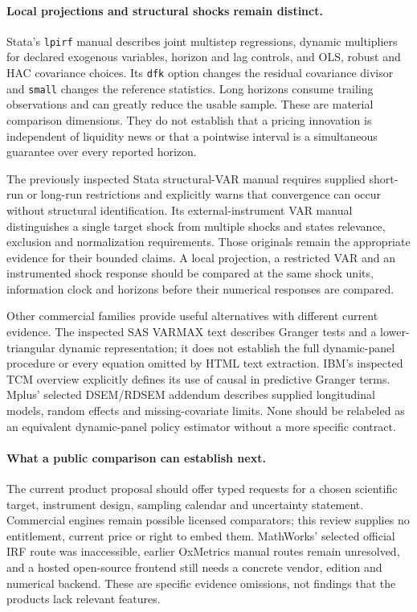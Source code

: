 \paragraph{Local projections and structural shocks remain distinct.}
Stata's \texttt{lpirf} manual describes joint multistep regressions, dynamic
multipliers for declared exogenous variables, horizon and lag controls, and
OLS, robust and HAC covariance choices. Its \texttt{dfk} option changes
the residual covariance divisor and \texttt{small} changes the reference
statistics. Long horizons consume trailing observations and can greatly
reduce the usable sample. These are material comparison dimensions. They
do not establish that a pricing innovation is independent of liquidity news
or that a pointwise interval is a simultaneous guarantee over every reported
horizon.\citep{exec19_dynamic_stata_lp}

The previously inspected Stata structural-VAR manual requires supplied
short-run or long-run restrictions and explicitly warns that convergence
can occur without structural identification. Its external-instrument VAR
manual distinguishes a single target shock from multiple shocks and states
relevance, exclusion and normalization requirements. Those originals remain
the appropriate evidence for their bounded claims. A local projection, a
restricted VAR and an instrumented shock response should be compared at the
same shock units, information clock and horizons before their numerical
responses are compared.\citep{exec13_ct_stata_svar,exec13_ct_stata_ivsvar}

Other commercial families provide useful alternatives with different current
evidence. The inspected SAS VARMAX text describes Granger tests and a
lower-triangular dynamic representation; it does not establish the full
dynamic-panel procedure or every equation omitted by HTML text extraction.
IBM's inspected TCM overview explicitly defines its use of causal in
predictive Granger terms. Mplus' selected DSEM/RDSEM addendum describes
supplied longitudinal models, random effects and missing-covariate limits.
None should be relabeled as an equivalent dynamic-panel policy estimator
without a more specific contract.\citep{exec13_ct_sas_causal,
exec13_ct_sas_structural,exec13_ct_ibm_tcm,exec13_ct_mplus81}

\paragraph{What a public comparison can establish next.}
The current product proposal should offer typed requests for a chosen
scientific target, instrument design, sampling calendar and uncertainty
statement. Commercial engines remain possible licensed comparators; this
review supplies no entitlement, current price or right to embed them.
MathWorks' selected official IRF route was inaccessible, earlier OxMetrics
manual routes remain unresolved, and a hosted open-source frontend still
needs a concrete vendor, edition and numerical backend. These are specific
evidence omissions, not findings that the products lack relevant features.

